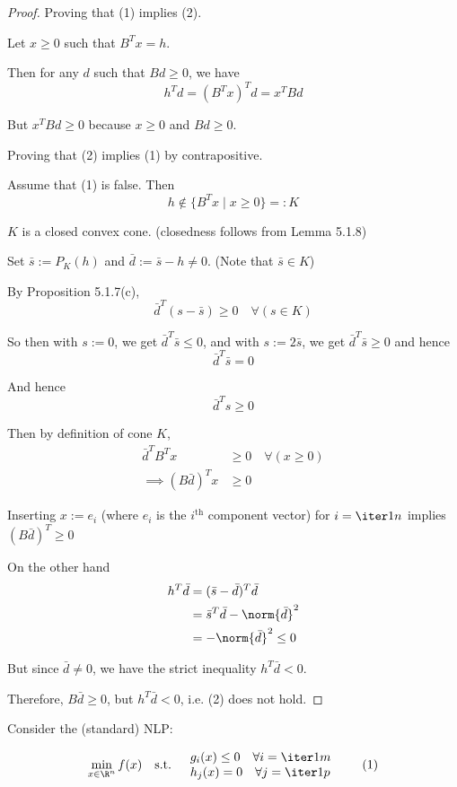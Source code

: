 \begin{proof}
	Proving that (1) implies (2).

	Let $x\geq0$ such that $B^Tx=h$.

	Then for any $d$ such that $Bd\geq0$, we have
	$$
		h^Td = (B^Tx)^Td = x^TBd
	$$

	But $x^TBd\geq0$ because $x\geq0$ and $Bd\geq0$.

	Proving that (2) implies (1) by contrapositive.

	Assume that (1) is false. Then
	$$
		h\notin\{B^Tx \mid x\geq0\}=:K
	$$

	$K$ is a closed convex cone. (closedness follows from Lemma 5.1.8)

	Set $\bar s:=P_K(h)$ and $\bar d:=\bar s-h\neq0$. (Note that $\bar
		s\in K$)

	By Proposition 5.1.7(c),
	$$
		\bar d^T(s-\bar s)\geq0\quad\forall(s\in K)
	$$

	So then with $s:=0$, we get $\bar d^T\bar s\leq0$, and with
	$s:=2\bar s$, we get $\bar d^T\bar s\geq0$ and hence
	$$
		\bar d^T\bar s=0
	$$

	And hence
	$$
		\bar d^Ts\geq0
	$$

	Then by definition of cone $K$,
	\begin{align*}
		\bar d^T B^Tx         & \geq0\quad\forall(x\geq0) \\
		\implies (B\bar d)^Tx & \geq 0
	\end{align*}


	Inserting $x:=e_i$ (where $e_i$ is the $i^\text{th}$ component
	vector) for $i=\iter1n$ implies $(B\bar d)^T\geq0$

	On the other hand
	\begin{align*}
		h^T\bar d & = (\bar s-\bar d)^T\bar d        \\
		          & = \bar s^T\bar d-\norm{\bar d}^2 \\
		          & = -\norm{\bar d}^2 \leq 0
	\end{align*}

	But since $\bar d\neq0$, we have the strict inequality $h^T\bar d<0$.

	Therefore, $B\bar d\geq0$, but $h^T\bar d<0$, i.e. (2) does not
	hold.
\end{proof}

\label{b38093d}

Consider the (standard) NLP:

\begin{equation*}
	\min_{x\in\R^n} f(x)\quad\text{s.t.}\quad\begin{array}{l}
		g_i(x)\leq0 \quad\forall i=\iter1m \\
		h_j(x)=0    \quad\forall j=\iter1p
	\end{array}
	\tag*{(1)}
\end{equation*}

